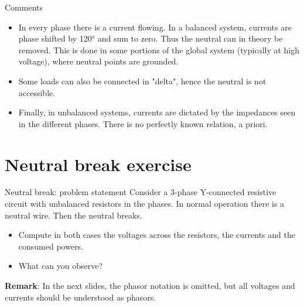 \begin{frame}{Comments}
    \begin{itemize}
        \item In every phase there is a current flowing. In a balanced system, currents are phase shifted by 120° and sum to zero. Thus the neutral can in theory be removed. This is done in some portions of the global system (typically at high voltage), where neutral points are grounded.
        \item Some loads can also be connected in "delta", hence the neutral is not accessible.
        \item Finally, in unbalanced systems, currents are dictated by the impedances seen in the different phases. There is no perfectly known relation, a priori.
    \end{itemize}
\end{frame}

\section{Neutral break exercise}
\begin{frame}{Neutral break: problem statement}
    Consider a 3-phase Y-connected resistive circuit with unbalanced resistors in the phases. In normal operation there is a neutral wire. Then the neutral breaks.
    \begin{itemize}
        \item Compute in both cases the voltages across the resistors, the currents and the consumed powers.
        \item What can you observe?
    \end{itemize}
    \textbf{Remark}: In the next slides, the phasor notation is omitted, but all voltages and currents should be understood as phasors.
\end{frame}


